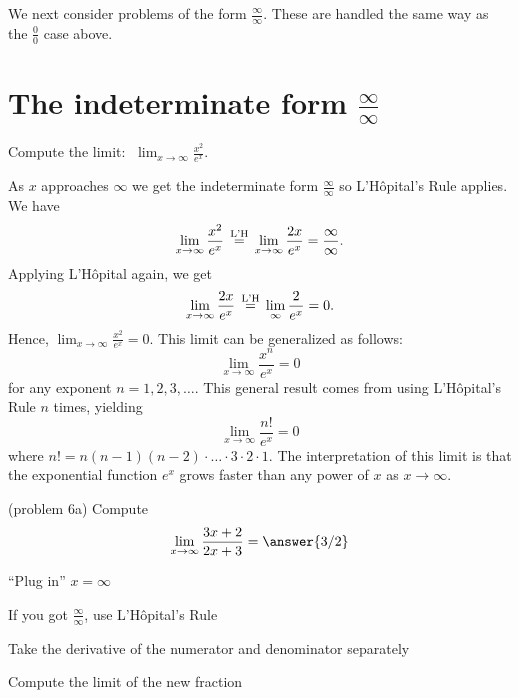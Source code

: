 \documentclass[handout]{ximera}
\begin{document}
We next consider problems of the form $\frac{\infty}{\infty}$.  These are handled the same way as the $\frac00$ case above.


\section{The indeterminate form $\frac{\infty}{\infty}$}



\begin{example}[example 6]
Compute the limit:  $\displaystyle{\;\lim_{x \to \infty} \frac{x^2}{e^x}}.$

As $x$ approaches $\infty$ we get the indeterminate form $\frac{\infty}{\infty}$ so L'H\^{o}pital's Rule applies.
We have 
\[\lim_{x\to \infty} \frac{x^2}{e^x} \,\overset{\scriptsize\text{L'H}}{=}\, \lim_{x \to \infty} \frac{2x}{e^x} = \frac{\infty}{\infty}.\]
Applying L'H\^{o}pital again, we get
\[\lim_{x \to \infty} \frac{2x}{e^x} \,\overset{\scriptsize\text{L'H}}{=}\, \lim_{\infty} \frac{2}{e^x} = 0.\]
Hence, $\lim_{x\to\infty}\frac{x^2}{e^x}=0$.  
This limit can be generalized as follows:
\[\lim_{x\to\infty}\frac{x^n}{e^x} =0\]
for any exponent $n = 1, 2, 3, \dots$.
This general result comes from using L'H\^{o}pital's Rule $n$ times, yielding
\[\lim_{x\to\infty} \frac{n!}{e^x} =0\]
where $n! = n(n-1)(n-2)\cdot \dots \cdot 3\cdot 2\cdot 1$.
The interpretation of this limit is that the exponential function $e^x$ grows faster than any power of $x$ as $x \to \infty$.
\end{example}




\begin{problem}(problem 6a)
  Compute
  \[
  \lim_{x \to \infty} \frac{3x+2}{2x + 3} = \answer{3/2}
  \]
  
    \begin{hint}
      ``Plug in'' $x=\infty$
    \end{hint}
    \begin{hint}
      If you got $\frac{\infty}{\infty}$, use L'H\^{o}pital's Rule
    \end{hint}
    \begin{hint}
      Take the derivative of the numerator and denominator separately
    \end{hint}
		\begin{hint}
      Compute the limit of the new fraction
    \end{hint}
	
\end{problem}
\end{document}
